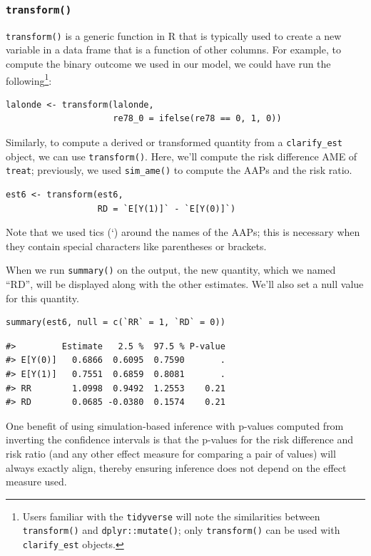 \hypertarget{transform}{%
\subsubsection{\texorpdfstring{\texttt{transform()}}{transform()}}\label{transform}}

\texttt{transform()} is a generic function in R that is typically used to create a new variable in a data frame that is a function of other columns. For example, to compute the binary outcome we used in our model, we could have run the following\footnote{Users familiar with the \texttt{tidyverse} will note the similarities between \texttt{transform()} and \texttt{dplyr::mutate()}; only \texttt{transform()} can be used with \texttt{clarify\_est} objects.}:

\begin{verbatim}
lalonde <- transform(lalonde,
                     re78_0 = ifelse(re78 == 0, 1, 0))
\end{verbatim}

Similarly, to compute a derived or transformed quantity from a \texttt{clarify\_est} object, we can use \texttt{transform()}. Here, we'll compute the risk difference AME of \texttt{treat}; previously, we used \texttt{sim\_ame()} to compute the AAPs and the risk ratio.

\begin{verbatim}
est6 <- transform(est6,
                  RD = `E[Y(1)]` - `E[Y(0)]`)
\end{verbatim}

Note that we used tics (`) around the names of the AAPs; this is necessary when they contain special characters like parentheses or brackets.

When we run \texttt{summary()} on the output, the new quantity, which we named ``RD'', will be displayed along with the other estimates. We'll also set a null value for this quantity.

\begin{verbatim}
summary(est6, null = c(`RR` = 1, `RD` = 0))
\end{verbatim}

\begin{verbatim}
#>         Estimate   2.5 %  97.5 % P-value
#> E[Y(0)]   0.6866  0.6095  0.7590       .
#> E[Y(1)]   0.7551  0.6859  0.8081       .
#> RR        1.0998  0.9492  1.2553    0.21
#> RD        0.0685 -0.0380  0.1574    0.21
\end{verbatim}

One benefit of using simulation-based inference with p-values computed from inverting the confidence intervals is that the p-values for the risk difference and risk ratio (and any other effect measure for comparing a pair of values) will always exactly align, thereby ensuring inference does not depend on the effect measure used.


